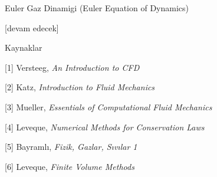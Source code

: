 \documentclass[12pt,fleqn]{article}\usepackage{../../common}
\begin{document}
Euler Gaz Dinamigi (Euler Equation of Dynamics)

[devam edecek]

Kaynaklar

[1] Versteeg, {\em An Introduction to CFD}

[2] Katz, {\em Introduction to Fluid Mechanics}

[3] Mueller, {\em Essentials of Computational Fluid Mechanics}

[4] Leveque, {\em Numerical Methods for Conservation Laws}

[5] Bayramlı, {\em Fizik, Gazlar, Sıvılar 1}

[6] Leveque, {\em Finite Volume Methods}
\end{document}
